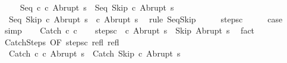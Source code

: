 \begin{isabellebody}
\ \ \isamarkupfalse%
\ {\isachardoublequoteopen}{\isasymGamma}{\isasymturnstile}\ {\isacharparenleft}Seq\ c\ c\ Abrupt\ s{\isacharparenright}\ {\isasymrightarrow}\isactrlsup {\isacharasterisk}\ {\isacharparenleft}Seq\ Skip\ c\ Abrupt\ s{\isacharparenright}{\isachardoublequoteclose}\isacommand{{\isachardot}}\isamarkupfalse%
\isanewline
\ \ \isamarkupfalse%
\isanewline
\ \ \isamarkupfalse%
\ {\isachardoublequoteopen}{\isasymGamma}{\isasymturnstile}\ {\isacharparenleft}Seq\ Skip\ c\ Abrupt\ s{\isacharparenright}\ {\isasymrightarrow}\ {\isacharparenleft}c\ Abrupt\ s{\isacharparenright}{\isachardoublequoteclose}\ \isamarkupfalse%
\ {\isacharparenleft}rule\ SeqSkip{\isacharparenright}\isanewline
\ \ \isamarkupfalse%
\ \isamarkupfalse%
\ steps{\isacharunderscore}c\isanewline
\ \ \isamarkupfalse%
\ \isamarkupfalse%
\ {\isacharquery}case\ \isamarkupfalse%
\ simp\isanewline
{}\isamarkupfalse%
\isanewline
\ \ \isamarkupfalse%
\ {\isacharparenleft}Catch\ c\ c\isanewline
\ \ \isamarkupfalse%
\ steps{\isacharunderscore}c\ {\isachardoublequoteopen}{\isasymGamma}{\isasymturnstile}\ {\isacharparenleft}c\ Abrupt\ s{\isacharparenright}\ {\isasymrightarrow}\isactrlsup {\isacharasterisk}\ {\isacharparenleft}Skip{\isacharcomma}\ Abrupt\ s{\isacharparenright}{\isachardoublequoteclose}\ \isamarkupfalse%
\ fact\isanewline
\ \ \isamarkupfalse%
\ CatchSteps\ {\isacharbrackleft}OF\ steps{\isacharunderscore}c\ refl\ refl{\isacharbrackright}\isanewline
\ \ \isamarkupfalse%
\ {\isachardoublequoteopen}{\isasymGamma}{\isasymturnstile}\ {\isacharparenleft}Catch\ c\ c\ Abrupt\ s{\isacharparenright}\ {\isasymrightarrow}\isactrlsup {\isacharasterisk}\ {\isacharparenleft}Catch\ Skip\ c\ Abrupt\ s{\isacharparenright}{\isachardoublequoteclose}\isacommand{{\isachardot}}\isamarkupfalse%
\isanewline
\ \ \isamarkupfalse%
\isanewline
\ \ \isamarkupfalse%

\end{isabellebody}
